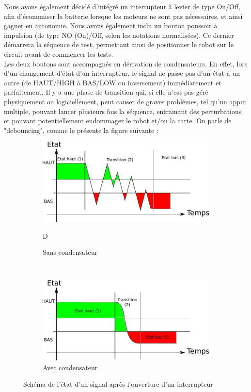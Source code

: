 			Nous avons également décidé d'intégré un interrupteur à levier de type On/Off, afin d'économiser la batterie lorsque les moteurs ne sont pas nécessaires, et ainsi gagner en autonomie. Nous avons également inclu un bouton poussoir à impulsion (de type NO (On)/Off, selon les notations normalisées). Ce dernier démarrera la séquence de test, permettant ainsi de positionner le robot sur le circuit avant de commencer les tests.\\
			Les deux boutons sont accompagnés en dérivation de condensateurs. En effet, lors d'un changement d'état d'un interrupteur, le signal ne passe pas d'un état à un autre (de HAUT/HIGH à BAS/LOW ou inversement) immédiatement et parfaitement. Il y a une phase de transition qui, si elle n'est pas géré physiquement ou logiciellement, peut causer de graves problèmes, tel qu'un appui multiple, pouvant lancer plusieurs fois la séquence, entrainant des perturbations et pouvant potentiellement endommager le robot et/ou la carte. On parle de "debouncing", comme le présente la figure suivante :
			\begin{figure}[H]
				\centering
				\begin{subfigure}[h]{0.45\textwidth}
			        \includegraphics[width=\textwidth]{Graphics/btnNoDebounce.pdf}
			        \caption{Sans condensateur}D
			    \end{subfigure}
			    ~
			    \begin{subfigure}[h]{0.45\textwidth}
			        \includegraphics[width=\textwidth]{Graphics/btnDebounce.pdf}
			        \caption{Avec condensateur}
			    \end{subfigure}
			    \caption{Schéma de l'état d'un signal après l'ouverture d'un interrupteur}
			\end{figure}
